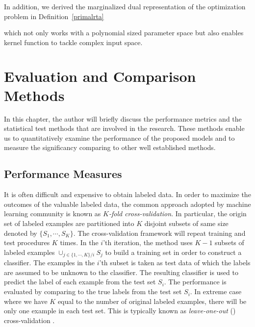 {In addition, we derived the marginalized dual representation of the optimization problem in Definition~\ref{primalrta}

which not only works with a polynomial sized parameter space but also enables kernel function to tackle complex input space.



%
\chapter{Evaluation and Comparison Methods} \label{ch_ecm}

In this chapter, the author will briefly discuss the performance metrics and the statistical test methods that are involved in the research. 
These methods enable us to quantitatively examine the performance of the proposed models and to measure the significancy comparing to other well established methods.

%
\section{Performance Measures} \label{sc_pm}

It is often difficult and expensive to obtain labeled data. 
In order to maximize the outcomes of the valuable labeled data, the common approach adopted by machine learning community is known as \textit{$K$-fold cross-validation}.
In particular, the origin set of labeled examples are partitioned into $K$ disjoint subsets of same size denoted by $\{S_1,\cdots,S_K\}$.
The cross-validation framework will repeat training and test procedures $K$ times.
In the $i$'th iteration, the method uses $K-1$ subsets of labeled examples $\cup_{j\in\{1,\cdots,K\}/i}S_j$ to build a training set in order to construct a classifier.
The examples in the $i$'th subset is taken as test data of which the labels are assumed to be unknown to the classifier.
The resulting classifier is used to predict the label of each example from the test set $S_i$.
The performance is evaluated by comparing to the true labels from the test set $S_i$.
In extreme case where we have $K$ equal to the number of original labeled examples, there will be only one example in each test set.
This is typically known as \textit{leave-one-out} (\loo) {cross-validation} .

}
